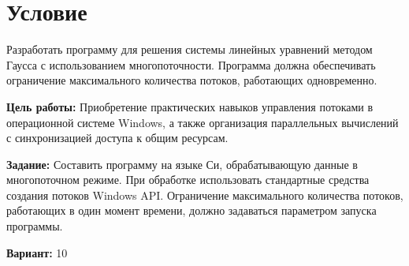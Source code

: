 \section{Условие}
Разработать программу для решения системы линейных уравнений методом Гаусса с использованием многопоточности. Программа должна обеспечивать ограничение максимального количества потоков, работающих одновременно.

{\bfseries Цель работы:} Приобретение практических навыков управления потоками в операционной системе Windows, а также организация параллельных вычислений с синхронизацией доступа к общим ресурсам.

{\bfseries Задание:} Составить программу на языке Си, обрабатывающую данные в многопоточном режиме. При обработке использовать стандартные средства создания потоков Windows API. Ограничение максимального количества потоков, работающих в один момент времени, должно задаваться параметром запуска программы.

{\bfseries Вариант:} 10